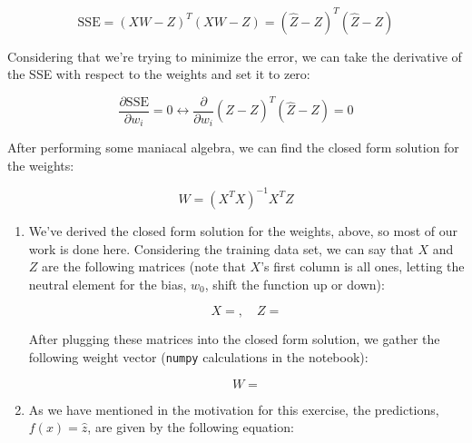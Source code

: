 \documentclass[12pt]{article}
\begin{document}
\begin{enumerate}[leftmargin=\labelsep]
        \begin{equation*}
          \text{SSE} = (XW - Z)^T (XW - Z) = (\hat{Z} - Z)^T (\hat{Z} - Z)
        \end{equation*}

        Considering that we're trying to minimize the error, we can take the derivative
        of the SSE with respect to the weights and set it to zero:

        \begin{equation*}
          \frac{\partial \text{SSE}}{\partial w_i} = 0 \leftrightarrow
          \frac{\partial}{\partial w_i} (\hat{Z} - Z)^T (\hat{Z} - Z) = 0
        \end{equation*}

        After performing some maniacal algebra, we can find the closed form solution
        for the weights:

        \begin{equation*}
          W = (X^T X)^{-1} X^T Z
        \end{equation*}

        \begin{enumerate}
          \item {
                We've derived the closed form solution for the weights, above, so most
                of our work is done here. Considering the training data set, we can
                say that $X$ and $Z$ are the following matrices (note that $X$'s first
                column is all ones, letting the neutral element for the bias, $w_0$,
                shift the function up or down):

                \begin{equation*}
                  X = , \quad
                  Z = 
                \end{equation*}
                }

                After plugging these matrices into the closed form solution, we gather
                the following weight vector (\texttt{numpy} calculations in the notebook):

                \begin{equation*}
                  W = 
                \end{equation*}
          \item {
                As we have mentioned in the motivation for this exercise, the predictions,
                $f(x) = \hat{z}$, are given by the following equation:

}
\end{enumerate}
\end{enumerate}
\end{document}
